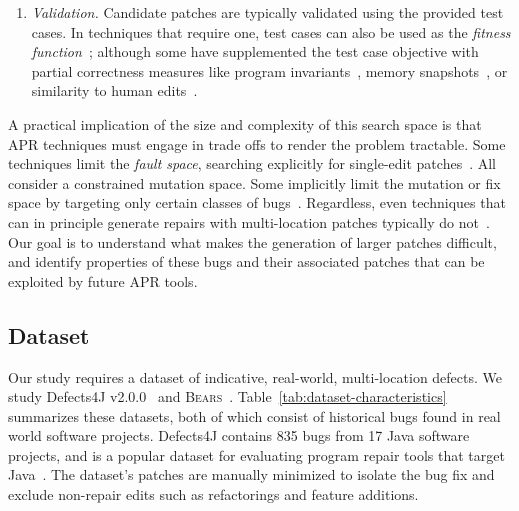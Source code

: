 \documentclass[10pt,journal,compsoc]{IEEEtran}
\newcommand\bears{\textsc{Bears}\xspace}
\begin{document}
\begin{enumerate}[wide]
\item \emph {Validation.}
Candidate patches are typically
validated using the provided test cases. In techniques
that require one, test cases can also be used as the \emph{fitness
  function}~\cite{genprog}; although some have supplemented the test case
objective with partial correctness measures like program
invariants~\cite{dinglyu}, memory snapshots~\cite{source-code-checkpoint}, or
similarity to human edits~\cite{hdrepair}.

\end{enumerate}

A practical implication of the size and complexity of this search space is
that APR techniques must engage in trade offs to render the problem tractable. 
Some techniques limit the \emph{fault space},
searching explicitly for single-edit patches~\cite{rsrepair,ae,hdrepair,capgen}.
All consider a constrained mutation space. 
Some implicitly limit the mutation or fix space by targeting only certain
classes of bugs~\cite{Xuan17,sapfix,DeMarco14,par}. Regardless, even techniques
that can in principle generate repairs with multi-location patches typically
do not~\cite{patch-correctness}.
%
%
Our goal is to understand what makes the generation of larger
patches difficult, and identify properties of these bugs and their associated
patches that can be exploited by future APR tools.  

\subsection{Dataset}
\label{sec:bugs}

Our study requires a dataset of indicative, real-world,
multi-location defects.  We study 
Defects4J v2.0.0~\cite{defects4j} and \bears~\cite{bears}.  Table~\ref{tab:dataset-characteristics}
summarizes these datasets, both of which
consist of historical
bugs found in real world software projects. Defects4J contains 835 bugs from 
17 Java software projects, and is a popular dataset for evaluating 
program repair tools that target 
Java~\cite{durieux-repair-them-all,pearson2017evaluating,saha2017elixir,saha2019harnessing,xin2017leveraging,b2016learning}.
The dataset's patches are manually minimized to isolate the bug fix 
and exclude non-repair edits such as refactorings and feature additions.
\end{document}
